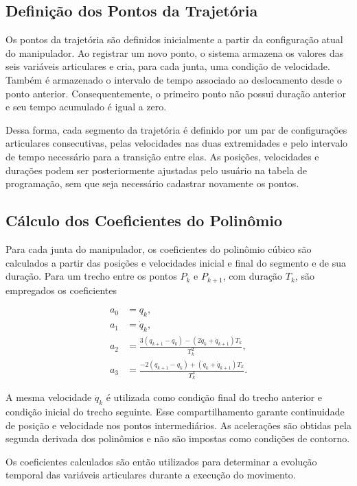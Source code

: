 \subsection{Definição dos Pontos da Trajetória}

Os pontos da trajetória são definidos inicialmente a partir da configuração atual do manipulador. Ao registrar um novo ponto, o sistema armazena os valores das seis variáveis articulares e cria, para cada junta, uma condição de velocidade. Também é armazenado o intervalo de tempo associado ao deslocamento desde o ponto anterior. Consequentemente, o primeiro ponto não possui duração anterior e seu tempo acumulado é igual a zero.

Dessa forma, cada segmento da trajetória é definido por um par de configurações articulares consecutivas, pelas velocidades nas duas extremidades e pelo intervalo de tempo necessário para a transição entre elas. As posições, velocidades e durações podem ser posteriormente ajustadas pelo usuário na tabela de programação, sem que seja necessário cadastrar novamente os pontos.

\subsection{Cálculo dos Coeficientes do Polinômio}

Para cada junta do manipulador, os coeficientes do polinômio cúbico são calculados a partir das posições e velocidades inicial e final do segmento e de sua duração. Para um trecho entre os pontos $P_k$ e $P_{k+1}$, com duração $T_k$, são empregados os coeficientes

\begin{align}
a_0 &= q_k, \\
a_1 &= \dot{q}_k, \\
a_2 &= \frac{3(q_{k+1}-q_k)-(2\dot{q}_k+\dot{q}_{k+1})T_k}{T_k^2}, \\
a_3 &= \frac{-2(q_{k+1}-q_k)+(\dot{q}_k+\dot{q}_{k+1})T_k}{T_k^3}.
\end{align}

A mesma velocidade $\dot{q}_k$ é utilizada como condição final do trecho anterior e condição inicial do trecho seguinte. Esse compartilhamento garante continuidade de posição e velocidade nos pontos intermediários. As acelerações são obtidas pela segunda derivada dos polinômios e não são impostas como condições de contorno.

Os coeficientes calculados são então utilizados para determinar a evolução temporal das variáveis articulares durante a execução do movimento.

